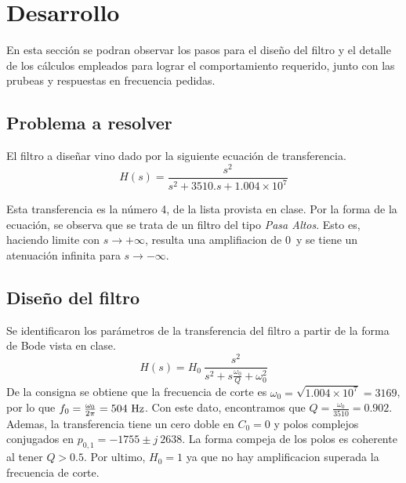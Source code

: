 \section*{Desarrollo}
En esta secci\'on se podran observar los pasos para el diseño del filtro y el detalle de los c\'alculos empleados para lograr el comportamiento requerido, junto con las prubeas y respuestas en frecuencia pedidas.\\


\subsection*{Problema a resolver}
El filtro a diseñar vino dado por la siguiente ecuaci\'on de transferencia. \\
\begin{equation}
	H(s)=\frac{s^2}{s^2+3510 . s+1.004\times10^7}	
\end{equation}


Esta transferencia es la n\'umero 4, de la lista provista en clase.
Por la forma de la ecuaci\'on, se observa que se trata de un filtro del tipo \textit{Pasa Altos}. Esto es, haciendo limite con $s \rightarrow +\infty$, resulta una amplifiacion de 0\dB \ y se tiene un atenuaci\'on infinita para $s\rightarrow-\infty$.

\subsection*{Diseño del filtro}
Se identificaron los par\'ametros de la transferencia del filtro a partir de la forma de Bode vista en clase.\\

\begin{equation}
  H(s)=H_0\ \frac{s^2}{s^2 +s \frac{\omega_0}{Q} +\omega_0^2}
\end{equation}
De la consigna se obtiene que la frecuencia de corte es 
$\omega_0=\sqrt{1.004\times10^7}=3169$, por lo que $f_0=\frac{\omega_0}{2\pi}=504\ \si{\hertz}$. Con este dato, encontramos que $Q=\frac{\omega_0}{3510}=0.902$.\\
Ademas, la transferencia tiene un cero doble en $C_0=0$ y polos complejos conjugados en $p_{0,1}= -1755\pm j\ 2638 $. La forma compeja de los polos es coherente al tener $Q>0.5$.
Por ultimo, $H_0 =1$  ya que no hay amplificacion superada la frecuencia de corte.\\
\pagebreak

